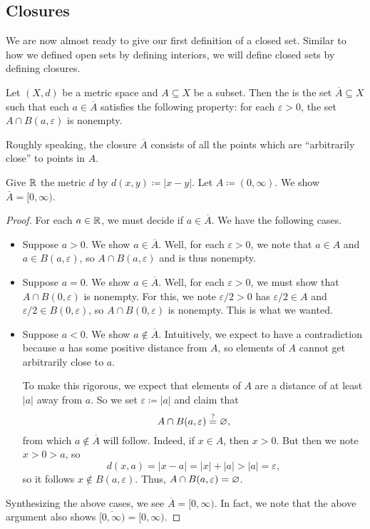 \documentclass[../main.tex]{subfiles}
\begin{document}
\subsection{Closures}
We are now almost ready to give our first definition of a closed set. Similar to how we defined open sets by defining interiors, we will define closed sets by defining closures.
\begin{definition}[closure] \label{defi:cl}
    Let $(X,d)$ be a metric space and $A\subseteq X$ be a subset. Then the  is the set $\overline A\subseteq X$ such that each $a\in\overline A$ satisfies the following property: for each $\varepsilon>0$, the set $A\cap B(a,\varepsilon)$ is nonempty.
\end{definition}
Roughly speaking, the closure $\overline A$ consists of all the points which are ``arbitrarily close'' to points in $A$.
\begin{example} \label{exe:closure-example}
    Give $\mathbb R$ the metric $d$ by $d(x,y)\coloneqq|x-y|$. Let $A\coloneqq(0,\infty)$. We show $\overline A=[0,\infty)$.
\end{example}
\begin{proof}
    For each $a\in\mathbb R$, we must decide if $a\in\overline A$. We have the following cases.
    \begin{itemize}
        \item Suppose $a>0$. We show $a\in\overline A$. Well, for each $\varepsilon>0$, we note that $a\in A$ and $a\in B(a,\varepsilon)$, so $A\cap B(a,\varepsilon)$ and is thus nonempty.
        \item Suppose $a=0$. We show $a\in\overline A$. Well, for each $\varepsilon>0$, we must show that $A\cap B(0,\varepsilon)$ is nonempty. For this, we note $\varepsilon/2>0$ has $\varepsilon/2\in A$ and $\varepsilon/2\in B(0,\varepsilon)$, so $A\cap B(0,\varepsilon)$ is nonempty. This is what we wanted.
        \item Suppose $a<0$. We show $a\notin\overline A$. Intuitively, we expect to have a contradiction because $a$ has some positive distance from $A$, so elements of $A$ cannot get arbitrarily close to $a$.

        To make this rigorous, we expect that elements of $A$ are a distance of at least $|a|$ away from $a$. So we set $\varepsilon\coloneqq|a|$ and claim that
        \[A\cap B(a,\varepsilon)\stackrel?=\varnothing,\]
        from which $a\notin\overline A$ will follow. Indeed, if $x\in A$, then $x>0$. But then we note $x>0>a$, so
        \[d(x,a)=|x-a|=|x|+|a|>|a|=\varepsilon,\]
        so it follows $x\notin B(a,\varepsilon)$. Thus, $A\cap B(a,\varepsilon)=\varnothing$.
    \end{itemize}
    Synthesizing the above cases, we see $\overline A=[0,\infty)$. In fact, we note that the above argument also shows $\overline{[0,\infty)}=[0,\infty)$.
\end{proof}
\end{document}
